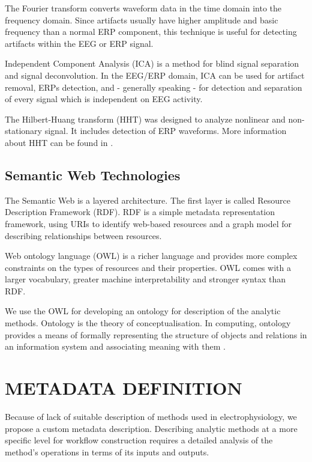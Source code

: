 \documentclass[a4paper,twoside]{article}
\begin{document}
The Fourier transform converts waveform data in the time domain into the frequency domain. Since artifacts usually have higher amplitude and basic frequency than a normal ERP component, this technique is useful for detecting artifacts
within the EEG or ERP signal.

Independent Component Analysis (ICA) \cite{Hyv01} is a method for blind signal separation and signal deconvolution.
In the EEG/ERP domain, ICA can be used for artifact removal, ERPs detection, and - generally speaking - for detection
and separation of every signal which is independent on EEG activity.

The  Hilbert-Huang  transform  (HHT)  was  designed  to  analyze  nonlinear  and  non-stationary signal. It includes detection of ERP waveforms.
More information about HHT can be found in \cite{Ciniburk11}.

\subsection{Semantic Web Technologies}

\noindent The Semantic Web is a layered architecture. The first layer
is called Resource Description Framework (RDF). RDF is
a simple metadata representation framework, using URIs to
identify web-based resources and a graph model for describing
relationships between resources.

Web ontology language (OWL) is a richer language and
provides more complex constraints on the types of resources
and their properties. OWL comes with a larger vocabulary,
greater machine interpretability and stronger syntax than RDF.

We use the OWL for developing an ontology for description of the analytic methods. Ontology is the theory of conceptualisation. In computing, ontology
provides a means of formally representing the structure of objects and relations in an information system and associating meaning with them \cite{Sun07}.


\section{\uppercase{Metadata Definition}}

\noindent Because of lack of suitable description of methods used in electrophysiology, we propose a custom metadata description. Describing analytic methods at a more specific level for workflow construction requires a detailed analysis of the method's operations in terms of its inputs and outputs.
\end{document}
